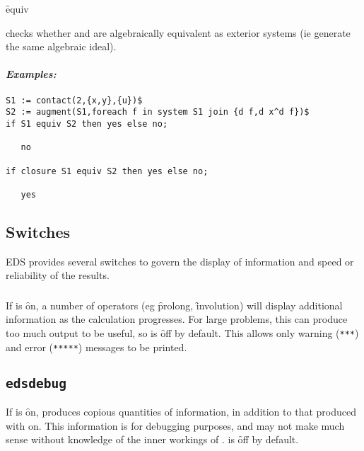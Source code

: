 \hypertarget{operator:EDS_EQUIV}{}
\begin{syntax}
	 \f{equiv} 
\end{syntax}
checks whether  and  are algebraically equivalent as
exterior systems (ie generate the same algebraic ideal).

\paragraph{\textit{Examples:}}
\begin{verbatim}
S1 := contact(2,{x,y},{u})$
S2 := augment(S1,foreach f in system S1 join {d f,d x^d f})$
if S1 equiv S2 then yes else no;

   no

if closure S1 equiv S2 then yes else no;

   yes
\end{verbatim}




\subsection{Switches}
\label{Switches}

EDS provides several switches to govern the display of information and
speed or reliability of the results.

\subsubsection{}
\label{edsverbose}

If  is \f{on}, a number of operators (eg \f{prolong},
\f{involution}) will display additional information as the calculation
progresses. For large problems, this can produce too much output to be
useful, so  is \f{off} by default. This allows only warning
(\texttt{***}) and error (\texttt{*****}) messages to be printed.

\subsection{{\texttt{edsdebug}}}
\label{edsdebug}

If  is \f{on},  produces copious quantities of information,
in addition to that produced with  on. This information is
for debugging purposes, and may not make much sense without knowledge of
the inner workings of .  is \f{off} by default.

